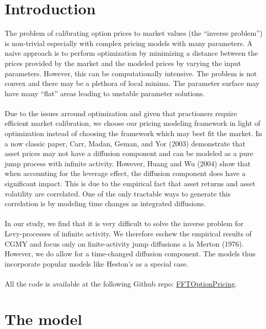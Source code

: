 \documentclass{article}
\begin{document}

\section{Introduction}
The problem of calibrating option prices to market values (the ``inverse problem'') is non-trivial especially with complex pricing models with many parameters.  A naive approach is to perform optimization by minimizing a distance between the prices provided by the market and the modeled prices by varying the input parameters.  However, this can be computationally intensive.  The problem is not convex and there may be a plethora of local minima. The parameter surface may have many ``flat'' areas leading to unstable parameter solutions.  
\\
\\
Due to the issues arround optimization and given that practioners require efficient market calibration, we choose our pricing modeling framework in light of optimization instead of choosing the framework which may best fit the market.  In a now classic paper, Carr, Madan, Geman, and Yor (2003) demonstrate that asset prices may not have a diffusion component and can be modeled as a pure jump process with infinite activity.  However, Huang and Wu (2004) show that when accounting for the leverage effect, the diffusion component does have a significant impact.  This is due to the empirical fact that asset returns and asset volatility are correlated.  One of the only tractable ways to generate this correlation is by modeling time changes as integrated diffusions.  
\\
\\
In our study, we find that it is very difficult to solve the inverse problem for Levy-processes of infinite activity.  We therefore eschew the empirical results of CGMY and focus only on finite-activity jump diffusions a la Merton (1976).  However, we do allow for a time-changed diffusion component.  The models thus incorporate popular models like Heston's as a special case.  
\\
\\
All the code is available at the following Github repo: \href{https://github.com/phillyfan1138/FFTOptionPricing/tree/calibrationResults}{FFTOptionPricing}.  


\section{The model}
\end{document}
